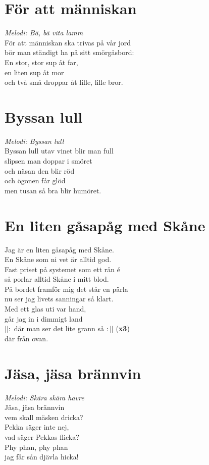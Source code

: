 \newpage
\section{För att människan}
\textit{Melodi: Bä, bä vita lamm}
\vspace{2mm}\\
För att människan ska trivas på vår jord\\
bör man ständigt ha på sitt smörgåsbord:\\
En stor, stor sup åt far,\\
en liten sup åt mor\\
och två små droppar åt lille, lille bror.

\section{Byssan lull}
\textit{Melodi: Byssan lull}
\vspace{2mm}\\
Byssan lull utav vinet blir man full\\
slipsen man doppar i smöret\\
och näsan den blir röd\\
och ögonen får glöd\\
men tusan så bra blir humöret.

\section{En liten gåsapåg med Skåne}
Jag är en liten gåsapåg med Skåne.\\
En Skåne som ni vet är alltid god.\\
Fast priset på systemet som ett rån é\\
så porlar alltid Skåne i mitt blod.\\
På bordet framför mig det står en pärla\\
nu ser jag livets sanningar så klart.\\
Med ett glas uti var hand,\\
går jag in i dimmigt land\\
$||:$ där man ser det lite grann så $:||$ (\textbf{x3})\\
där från ovan.

\section{Jäsa, jäsa brännvin}
\textit{Melodi: Skära skära havre}
\vspace{2mm}\\
Jäsa, jäsa brännvin\\
vem skall mäsken dricka?\\
Pekka säger inte nej,\\
vad säger Pekkas flicka?\\
Phy phan, phy phan\\
jag får sån djävla hicka!

